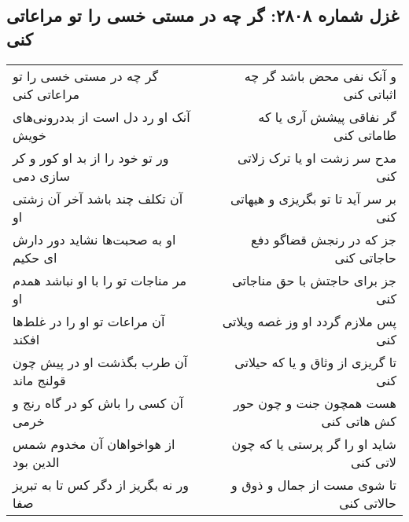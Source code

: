\begin{center}
\section*{غزل شماره ۲۸۰۸: گر چه در مستی خسی را تو مراعاتی کنی}
\label{sec:2808}
\begin{longtable}{l p{0.5cm} r}
گر چه در مستی خسی را تو مراعاتی کنی
&&
و آنک نفی محض باشد گر چه اثباتی کنی
\\
آنک او رد دل است از بددرونی‌های خویش
&&
گر نفاقی پیشش آری یا که طاماتی کنی
\\
ور تو خود را از بد او کور و کر سازی دمی
&&
مدح سر زشت او یا ترک زلاتی کنی
\\
آن تکلف چند باشد آخر آن زشتی او
&&
بر سر آید تا تو بگریزی و هیهاتی کنی
\\
او به صحبت‌ها نشاید دور دارش ای حکیم
&&
جز که در رنجش قضاگو دفع حاجاتی کنی
\\
مر مناجات تو را با او نباشد همدم او
&&
جز برای حاجتش با حق مناجاتی کنی
\\
آن مراعات تو او را در غلط‌ها افکند
&&
پس ملازم گردد او وز غصه ویلاتی کنی
\\
آن طرب بگذشت او در پیش چون قولنج ماند
&&
تا گریزی از وثاق و یا که حیلاتی کنی
\\
آن کسی را باش کو در گاه رنج و خرمی
&&
هست همچون جنت و چون حور کش هاتی کنی
\\
از هواخواهان آن مخدوم شمس الدین بود
&&
شاید او را گر پرستی یا که چون لاتی کنی
\\
ور نه بگریز از دگر کس تا به تبریز صفا
&&
تا شوی مست از جمال و ذوق و حالاتی کنی
\\
\end{longtable}
\end{center}
